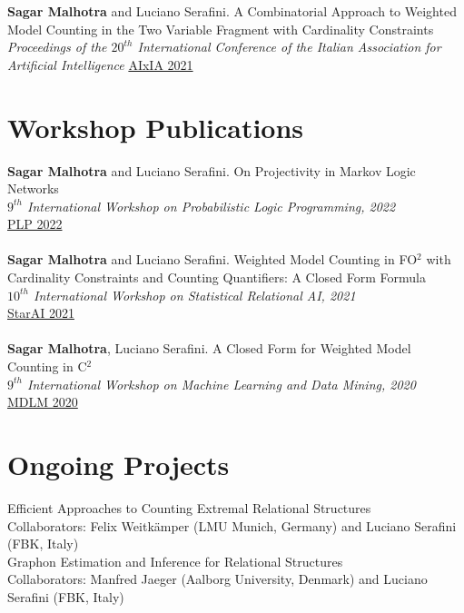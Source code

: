 \documentclass[10pt, a4paper]{article}
\newcommand{\years}[1]{\marginnote{\scriptsize #1}}
\begin{document}
\years{2021}\textbf{Sagar Malhotra} and Luciano Serafini. A Combinatorial Approach to Weighted Model Counting in the Two Variable Fragment with Cardinality Constraints\\ \emph{ Proceedings of the $20^{th}$ International Conference of the Italian Association for Artificial Intelligence}
\href{https://link.springer.com/chapter/10.1007/978-3-031-08421-8_10}{AIxIA 2021}


\section*{Workshop Publications}
\noindent
\years{2022}\textbf{Sagar Malhotra} and Luciano Serafini. On Projectivity in Markov Logic Networks\\ \emph{$9^{th}$ International Workshop on Probabilistic Logic Programming, 2022}\\ 
\href{https://easychair.org/publications/preprint/2lTk}{PLP 2022}\\ \\ 
\years{2021}\textbf{Sagar Malhotra} and Luciano Serafini. Weighted Model Counting in FO$^2$ with Cardinality Constraints and Counting Quantifiers: A Closed Form Formula\\ \emph{$10^{th}$ International Workshop on Statistical Relational AI, 2021}\\
\href{https://starai.cs.kuleuven.be/2021/}{StarAI 2021} \\ \\ 
\years{{2020}}\textbf{Sagar Malhotra}, Luciano Serafini. A Closed Form for Weighted Model Counting in C$^2$ \\
\emph{$9^{th}$ International Workshop on Machine Learning and Data Mining, 2020}\\ 
\href{https://sites.google.com/view/mldm2020-workshop/program?authuser=0}{MDLM 2020}



\section*{Ongoing Projects}
\noindent

Efficient Approaches to Counting Extremal Relational Structures\\
Collaborators: Felix Weitkämper (LMU Munich, Germany) and Luciano Serafini (FBK, Italy)\\ 

Graphon Estimation and Inference for Relational Structures\\
Collaborators: Manfred Jaeger (Aalborg University, Denmark) and Luciano Serafini (FBK, Italy) 
\end{document}
